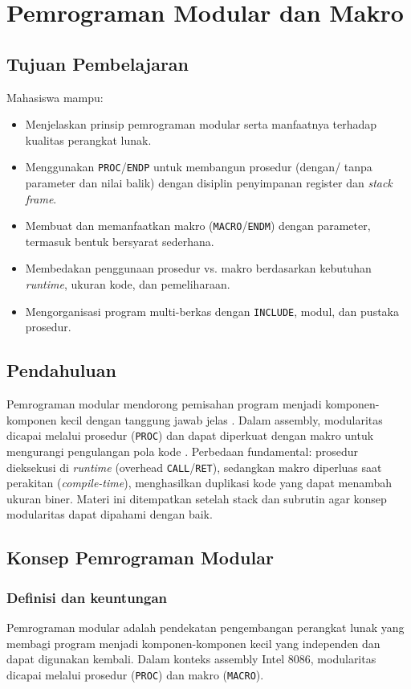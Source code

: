 \documentclass[../main.tex]{subfiles}
\begin{document}
\chapter{Pemrograman Modular dan Makro}

    \section{Tujuan Pembelajaran}
        Mahasiswa mampu:
        \begin{itemize}
            \item Menjelaskan prinsip pemrograman modular serta manfaatnya terhadap kualitas perangkat lunak.
            \item Menggunakan \texttt{PROC}/\texttt{ENDP} untuk membangun prosedur (dengan/ tanpa parameter dan nilai balik) dengan disiplin penyimpanan register dan \textit{stack frame}.
            \item Membuat dan memanfaatkan makro (\texttt{MACRO}/\texttt{ENDM}) dengan parameter, termasuk bentuk bersyarat sederhana.
            \item Membedakan penggunaan prosedur vs. makro berdasarkan kebutuhan \textit{runtime}, ukuran kode, dan pemeliharaan.
            \item Mengorganisasi program multi-berkas dengan \texttt{INCLUDE}, modul, dan pustaka prosedur.
        \end{itemize}

    \section{Pendahuluan}
        Pemrograman modular mendorong pemisahan program menjadi komponen-komponen kecil dengan tanggung jawab jelas \cite{assembly_language_programming_guide}. Dalam assembly, modularitas dicapai melalui prosedur (\texttt{PROC}) dan dapat diperkuat dengan makro untuk mengurangi pengulangan pola kode \cite{tutorials_point_assembly}. Perbedaan fundamental: prosedur dieksekusi di \textit{runtime} (overhead \texttt{CALL}/\texttt{RET}), sedangkan makro diperluas saat perakitan (\textit{compile-time}), menghasilkan duplikasi kode yang dapat menambah ukuran biner. Materi ini ditempatkan setelah stack dan subrutin agar konsep modularitas dapat dipahami dengan baik.

    \section{Konsep Pemrograman Modular}
        \subsection{Definisi dan keuntungan}
            Pemrograman modular adalah pendekatan pengembangan perangkat lunak yang membagi program menjadi komponen-komponen kecil yang independen dan dapat digunakan kembali. Dalam konteks assembly Intel 8086, modularitas dicapai melalui prosedur (\texttt{PROC}) dan makro (\texttt{MACRO}).
\end{document}
